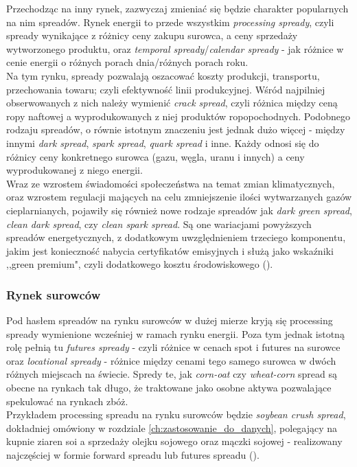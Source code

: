 Przechodząc na inny rynek, zazwyczaj zmieniać się będzie charakter popularnych na nim spreadów. Rynek energii to przede wszystkim \emph{processing spready}, czyli spready wynikające z różnicy ceny zakupu surowca, a ceny sprzedaży wytworzonego produktu, oraz \emph{temporal spready}/\emph{calendar spready} - jak różnice w cenie energii o różnych porach dnia/różnych porach roku.\\
Na tym rynku, spready pozwalają oszacować koszty produkcji, transportu, przechowania towaru; czyli efektywność linii produkcyjnej. Wśród najpilniej obserwowanych z nich należy wymienić \emph{crack spread}, czyli różnica między ceną ropy naftowej a wyprodukowanych z niej produktów ropopochodnych. Podobnego rodzaju spreadów, o równie istotnym znaczeniu jest jednak dużo więcej - między innymi \emph{dark spread}, \emph{spark spread}, \emph{quark spread} i inne. Każdy odnosi się do różnicy ceny konkretnego surowca (gazu, węgla, uranu i innych) a ceny wyprodukowanej z niego energii.\\
Wraz ze wzrostem świadomości społeczeństwa na temat zmian klimatycznych, oraz wzrostem regulacji mających na celu zmniejszenie ilości wytwarzanych gazów cieplarnianych, pojawiły się również nowe rodzaje spreadów jak \emph{dark green spread}, \emph{clean dark spread}, czy \emph{clean spark spread}. Są one wariacjami powyższych spreadów energetycznych, z dodatkowym uwzględnieniem trzeciego komponentu, jakim jest konieczność nabycia certyfikatów emisyjnych i służą jako wskaźniki ,,green premium", czyli dodatkowego kosztu środowiskowego (\cite{Carmona_Clean_Spreads}).

\subsubsection{Rynek surowców}

Pod hasłem spreadów na rynku surowców w dużej mierze kryją się processing spready wymienione wcześniej w ramach rynku energii. Poza tym jednak istotną rolę pełnią tu \emph{futures spready} - czyli różnice w cenach spot i futures na surowce oraz \emph{locational spready} - różnice między cenami tego samego surowca w dwóch różnych miejscach na świecie. Spredy te, jak \emph{corn-oat} czy \emph{wheat-corn} spread są obecne na rynkach tak długo, że traktowane jako osobne aktywa pozwalające spekulować na rynkach zbóż.\\
Przykładem processing spreadu na rynku surowców będzie \emph{soybean crush spread}, dokładniej omówiony w rozdziale \ref{ch:zastosowanie_do_danych}, polegający na kupnie ziaren soi a sprzedaży olejku sojowego oraz mączki sojowej - realizowany najczęściej w formie forward spreadu lub futures spreadu (\cite{Agro_Spreads}).